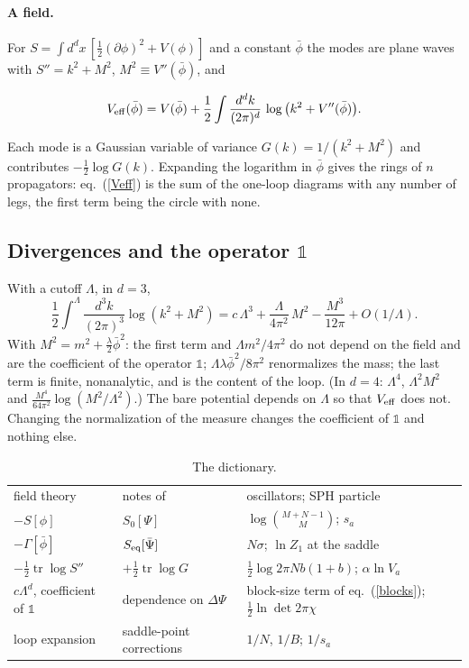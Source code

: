 \documentclass[11pt,aps,preprint,nofootinbib,superscriptaddress,tightenlines]{revtex4-2}
\newcommand{\one}{\mathds{1}}
\def\st{\begin{equation}}
\def\stp{\end{equation}}
\def\Eq#1{eq.~(\ref{#1})}
\def\tr{\operatorname{tr}}
\let\oldparagraph\paragraph
\renewcommand{\paragraph}{\par\bigskip\oldparagraph}
\begin{document}
\paragraph{A field.}  For $S=\int d^dx\,[\tfrac12(\partial\phi)^2+V(\phi)]$ and a constant $\bar\phi$ the modes are plane waves with
$S''=k^2+M^2$, $M^2\equiv V''(\bar\phi)$, and
\begin{keyeq}
\st
V_{\rm eff}(\bar\phi)=V(\bar\phi)+\frac12\int\frac{d^dk}{(2\pi)^d}\,\log\big(k^2+V''(\bar\phi)\big) .
\label{Veff}
\stp
\end{keyeq}
Each mode is a Gaussian variable of variance $G(k)=1/(k^2+M^2)$ and contributes $-\tfrac12\log G(k)$.  Expanding the logarithm in $\bar\phi$
gives the rings of $n$ propagators: \Eq{Veff} is the sum of the one-loop diagrams with any number of legs, the first term being the circle
with none.

\subsection{Divergences and the operator $\one$}
\label{sec:one}

With a cutoff $\Lambda$, in $d=3$,
\st
\frac12\int^\Lambda\frac{d^3k}{(2\pi)^3}\log(k^2+M^2)=c\,\Lambda^3+\frac{\Lambda}{4\pi^2}\,M^2-\frac{M^3}{12\pi}+O(1/\Lambda) .
\stp
With $M^2=m^2+\tfrac\lambda2\bar\phi^2$: the first term and $\Lambda m^2/4\pi^2$ do not depend on the field and are the coefficient of the
operator $\one$; $\Lambda\lambda\bar\phi^2/8\pi^2$ renormalizes the mass; the last term is finite, nonanalytic, and is the content of the loop.
(In $d=4$: $\Lambda^4$, $\Lambda^2M^2$ and $\tfrac{M^4}{64\pi^2}\log(M^2/\Lambda^2)$.)  The bare potential depends on $\Lambda$ so that
$V_{\rm eff}$ does not.  Changing the normalization of the measure changes the coefficient of $\one$ and nothing else.

\begin{table}[h]
\caption{The dictionary.}
\label{tab:dict}
\begin{ruledtabular}
\begin{tabular}{lll}
field theory & notes of \cite{basar} & oscillators; SPH particle \\
\colrule
$-S[\phi]$ & $S_0[\Psi]$ & $\log\binom{M+N-1}{M}$; $s_a$ \\
$-\Gamma[\bar\phi]$ & $S_{\rm eq}[\bar\Psi]$ & $N\sigma$; $\ln Z_1$ at the saddle \\
$-\tfrac12\tr\log S''$ & $+\tfrac12\tr\log G$ & $\tfrac12\log2\pi Nb(1+b)$; $\alpha\ln V_a$ \\
$c\Lambda^d$, coefficient of $\one$ & dependence on $\Delta\Psi$ & block-size term of \Eq{blocks}; $\tfrac12\ln\det2\pi\chi$ \\
loop expansion & saddle-point corrections & $1/N$, $1/B$; $1/s_a$ \\
\end{tabular}
\end{ruledtabular}
\end{table}
\end{document}
